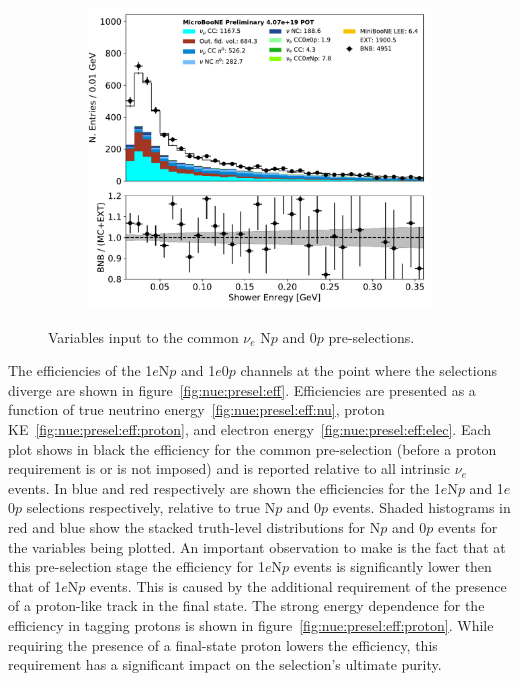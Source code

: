\documentclass[a4paper]{article}
\begin{document}
\begin{figure}[H]
\begin{center}
\begin{subfigure}[b]{0.3\textwidth}
    \caption{\label{fig:nue:presel:ntrack} }
    \end{subfigure}
    \begin{subfigure}[b]{0.3\textwidth}
    \centering
    \includegraphics[width=1.00\textwidth]{nueselection/shr_energy_tot_cali_01132020_RUN1.pdf}
    \caption{\label{fig:nue:presel:shrenergy} }
    \end{subfigure}
\caption{\label{fig:nue:presel}Variables input to the common $\nu_e$ N$p$ and 0$p$ pre-selections.}
\end{center}
\end{figure}

\par The efficiencies of the 1$e$N$p$ and 1$e$0$p$ channels at the point where the selections diverge are shown in figure~\ref{fig:nue:presel:eff}. Efficiencies are presented as a function of true neutrino energy~\ref{fig:nue:presel:eff:nu}, proton KE~\ref{fig:nue:presel:eff:proton}, and electron energy~\ref{fig:nue:presel:eff:elec}. Each plot shows in black the efficiency for the common pre-selection (before a proton requirement is or is not imposed) and is reported relative to all intrinsic $\nu_e$ events. In blue and red respectively are shown the efficiencies for the  1$e$N$p$ and 1$e$0$p$ selections respectively, relative to true N$p$ and 0$p$ events. Shaded histograms in red and blue show the stacked truth-level distributions for N$p$ and 0$p$ events for the variables being plotted. An important observation to make is the fact that at this pre-selection stage the efficiency for 1$e$N$p$ events is significantly lower then that of 1$e$N$p$ events. This is caused by the additional requirement of the presence of a proton-like track in the final state. The strong energy dependence for the efficiency in tagging protons is shown in figure~\ref{fig:nue:presel:eff:proton}. While requiring the presence of a final-state proton lowers the efficiency, this requirement has a significant impact on the selection's ultimate purity.
\end{document}
